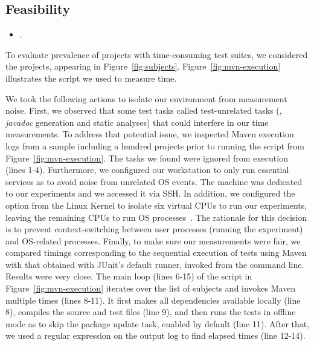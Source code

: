 \subsection{Feasibility}
\label{sec:rqA}
\label{sec:rqB}

\begin{itemize}
  \item \numRQFeasibilityOne{}. \textbf{\RQFeasibilityOne}
\end{itemize}

To evaluate prevalence of projects with time-consuming test suites, we
considered the \numSubjs{} projects, appearing in 
Figure~\ref{fig:subjects}.  Figure~\ref{fig:mvn-execution} illustrates
the script we used to measure time.

We took the following actions to isolate our environment from
measurement noise.
First, we observed that some test tasks called test-unrelated tasks
(\eg, \emph{javadoc} generation and static analyses) that could
interfere in our time measurements.
To address that potential issue, we inspected Maven execution logs
from a sample including a hundred projects prior to running the script
from Figure~\ref{fig:mvn-execution}.
The tasks we found were ignored from execution (lines 1-4).
Furthermore, we configured
our workstation to only run essential services as to avoid noise from unrelated OS events.
The machine was dedicated to our experiments and we
accessed it via SSH. In addition, we configured the 
option from the Linux Kernel \cite{linux-kernel} to isolate six
virtual CPUs to run our experiments, leaving the remaining CPUs to run
OS processes~\cite{isolcpus-use}.  The rationale for this decision is
to prevent context-switching between user processes (running the
experiment) and OS-related processes.  Finally, to make sure our
measurements were fair, we compared timings corresponding to the
sequential execution of tests using Maven with that obtained with
JUnit's default  runner, invoked from the command
line.  Results were very close.
The main loop (lines 6-15) of the script in
Figure~\ref{fig:mvn-execution} iterates over the list of subjects and
invokes Maven multiple times (lines 8-11).  It first makes all dependencies available locally
(line 8), compiles the source and test files (line 9), and then runs
the tests in offline mode as to skip the package update task, enabled
by default (line 11). After that, we used a regular expression on
the output log to find elapsed times (line 12-14).

